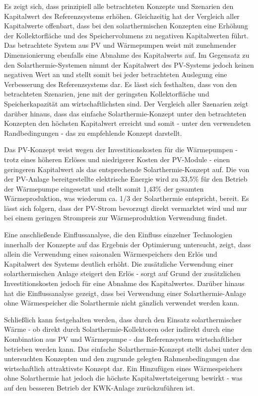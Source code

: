 Es zeigt sich, dass prinzipiell alle betrachteten Konzepte und Szenarien den Kapitalwert des Referenzsystems erhöhen. Gleichzeitig hat der Vergleich aller Kapitalwerte offenbart, dass bei den solarthermischen Konzepten eine Erhöhung der Kollektorfläche und des Speichervolumens zu negativen Kapitalwerten führt. Das betrachtete System aus \ac{PV} und Wärmepumpen weist mit zunehmender Dimensionierung ebenfalls eine Abnahme des Kapitalwerts auf. Im Gegensatz zu den Solarthermie-Systemen nimmt der Kapitalwert des \ac{PV}-Systems jedoch keinen negativen Wert an und stellt somit bei jeder betrachteten Auslegung eine Verbesserung des Referenzsystems dar. Es lässt sich festhalten, dass von den betrachteten Szenarien, jene mit der geringsten Kollektorfläche und Speicherkapazität am wirtschaftlichsten sind. Der Vergleich aller Szenarien zeigt darüber hinaus, dass das einfache Solarthermie-Konzept unter den betrachteten Konzepten den höchsten Kapitalwert erreicht und somit - unter den verwendeten Randbedingungen -  das zu empfehlende Konzept darstellt. 

Das \ac{PV}-Konzept weist wegen der Investitionskosten für die Wärmepumpen - trotz eines höheren Erlöses und niedrigerer Kosten der \ac{PV}-Module - einen geringeren Kapitalwert als das entsprechende Solarthermie-Konzept auf. Die von der \ac{PV}-Anlage bereitgestellte elektrische Energie wird zu 33,5\% für den Betrieb der Wärmepumpe eingesetzt und stellt somit 1,43\% der gesamten Wärmeproduktion, was wiederum ca. 1/3 der Solarthermie entspricht, bereit. Es lässt sich folgern, dass der \ac{PV}-Strom bevorzugt direkt vermarktet wird und nur bei einem geringen Strompreis zur Wärmeproduktion Verwendung findet.

Eine anschließende Einflussanalyse, die den Einfluss einzelner Technologien innerhalb der Konzepte auf das Ergebnis der Optimierung untersucht, zeigt, dass allein die Verwendung eines saisonalen Wärmespeichers den Erlös und Kapitalwert des Systems deutlich erhöht. Die zusätzliche Verwendung einer solarthermischen Anlage steigert den Erlös - sorgt auf Grund der zusätzlichen Investitionskosten jedoch für eine Abnahme des Kapitalwertes. Darüber hinaus hat die Einflussanalyse gezeigt, dass bei Verwendung einer Solarthermie-Anlage ohne Wärmespeicher die Solarthermie nicht gänzlich verwendet werden kann. 

Schließlich kann festgehalten werden, dass durch den Einsatz solarthermischer Wärme - ob direkt durch Solarthermie-Kollektoren oder indirekt durch eine Kombination aus \acl{PV} und Wärmepumpe - das Referenzsystem wirtschaftlicher betrieben werden kann. Das einfache Solarthermie-Konzept stellt dabei unter den untersuchten Konzepten und den zugrunde gelegten Rahmenbedingungen das wirtschaftlich attraktivste Konzept dar. Ein Hinzufügen eines Wärmespeichers ohne Solarthermie hat jedoch die höchste Kapitalwertsteigerung bewirkt - was auf den besseren Betrieb der KWK-Anlage zurückzuführen ist.

